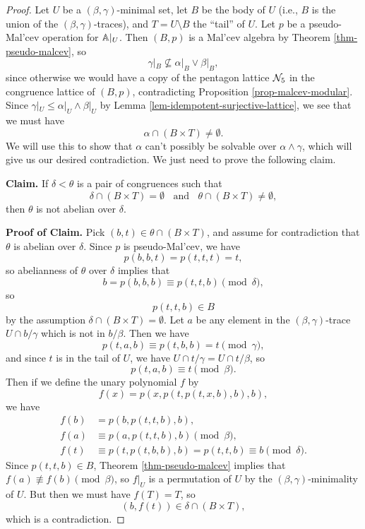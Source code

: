 \begin{appendices}
\begin{proof}
Let $U$ be a $(\beta, \gamma)$-minimal set, let $B$ be the body of $U$ (i.e., $B$ is the union of the $(\beta,\gamma)$-traces), and $T = U \setminus B$ the ``tail'' of $U$. Let $p$ be a pseudo-Mal'cev operation for $\mathbb{A}|_U$. Then $(B, p)$ is a Mal'cev algebra by Theorem \ref{thm-pseudo-malcev}, so
\[
\gamma|_B \not\subseteq \alpha|_B \vee \beta|_B,
\]
since otherwise we would have a copy of the pentagon lattice $\mathcal{N}_5$ in the congruence lattice of $(B, p)$, contradicting Proposition \ref{prop-malcev-modular}. Since $\gamma|_U \le \alpha|_U \wedge \beta|_U$ by Lemma \ref{lem-idempotent-surjective-lattice}, we see that we must have
\[
\alpha \cap (B\times T) \ne \emptyset.
\]
We will use this to show that $\alpha$ can't possibly be solvable over $\alpha \wedge \gamma$, which will give us our desired contradiction. We just need to prove the following claim.

{\bf Claim.} If $\delta < \theta$ is a pair of congruences such that
\[
\delta \cap (B \times T) = \emptyset \;\; \text{ and } \;\; \theta \cap (B \times T) \ne \emptyset,
\]
then $\theta$ is not abelian over $\delta$.

{\bf Proof of Claim.} Pick $(b,t) \in \theta \cap (B \times T)$, and assume for contradiction that $\theta$ is abelian over $\delta$. Since $p$ is pseudo-Mal'cev, we have
\[
p(b,b,t) = p(t,t,t) = t,
\]
so abelianness of $\theta$ over $\delta$ implies that
\[
b = p(b,b,b) \equiv p(t,t,b) \pmod{\delta},
\]
so
\[
p(t,t,b) \in B
\]
by the assumption $\delta \cap (B \times T) = \emptyset$. Let $a$ be any element in the $(\beta,\gamma)$-trace $U \cap b/\gamma$ which is not in $b/\beta$. Then we have
\[
p(t,a,b) \equiv p(t,b,b) = t \pmod{\gamma},
\]
and since $t$ is in the tail of $U$, we have $U \cap t/\gamma = U \cap t/\beta$, so
\[
p(t,a,b) \equiv t \pmod{\beta}.
\]
Then if we define the unary polynomial $f$ by
\[
f(x) = p(x,p(t,p(t,x,b),b),b),
\]
we have
\begin{align*}
f(b) &= p(b, p(t,t,b), b),\\
f(a) &\equiv p(a, p(t,t,b), b) \pmod{\beta},\\
f(t) &\equiv p(t, p(t, b, b), b) = p(t, t, b) \equiv b \pmod{\delta}.
\end{align*}
Since $p(t,t,b) \in B$, Theorem \ref{thm-pseudo-malcev} implies that $f(a) \not\equiv f(b) \pmod{\beta}$, so $f|_U$ is a permutation of $U$ by the $(\beta,\gamma)$-minimality of $U$. But then we must have $f(T) = T$, so
\[
(b, f(t)) \in \delta \cap (B \times T),
\]
which is a contradiction.
\end{proof}


\end{appendices}

